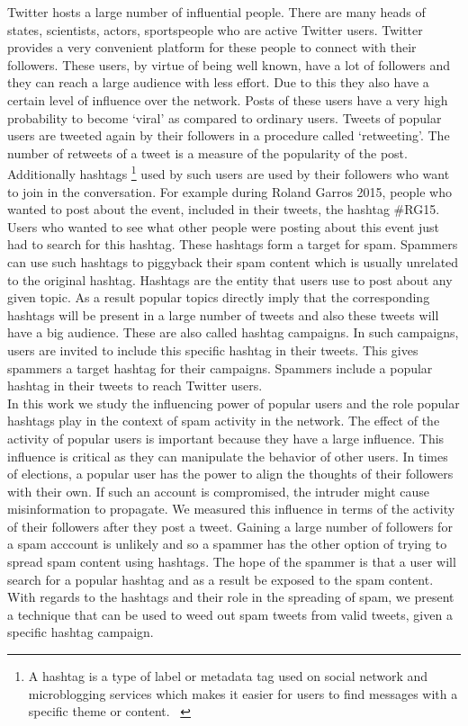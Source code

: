 \documentclass[journal, a4paper, 12pt]{article}
\begin{document}
Twitter hosts a large number of influential people. There are many heads of states, scientists, actors, sportspeople who are active Twitter users. Twitter provides a very convenient platform for these people to connect with their followers. These users, by virtue of being well known, have a lot of followers and they can reach a large audience with less effort. Due to this they also have a certain level of influence over the network. Posts of these users have a very high probability to become ‘viral’ as compared to ordinary users. Tweets of popular users are tweeted again by their followers in a procedure called ‘retweeting’. The number of retweets of a tweet is a measure of the popularity of the post. Additionally hashtags \footnote{A hashtag is a type of label or metadata tag used on social network and microblogging services which makes it easier for users to find messages with a specific theme or content. ~\cite{wikihashtag}} used by such users are used by their followers who want to join in the conversation. For example during Roland Garros 2015, people who wanted to post about the event, included in their tweets, the hashtag \#RG15. Users who wanted to see what other people were posting about this event just had to search for this hashtag. These hashtags form a target for spam. Spammers can use such hashtags to piggyback their spam content which is usually unrelated to the original hashtag. Hashtags are the entity that users use to post about any given topic. As a result popular topics directly imply that the corresponding hashtags will be present in a large number of tweets and also these tweets will have a big audience. These are also called hashtag campaigns. In such campaigns, users are invited to include this specific hashtag in their tweets. This gives spammers a target hashtag for their campaigns. Spammers include a popular hashtag in their tweets to reach Twitter users. \\

In this work we study the influencing power of popular users and the role popular hashtags play in the context of spam activity in the network. The effect of the activity of popular users is important because they have a large influence. This influence is critical as they can manipulate the behavior of other users. In times of elections, a popular user has the power to align the thoughts of their followers with their own. If such an account is compromised, the intruder might cause misinformation to propagate. We measured this influence in terms of the activity of their followers after they post a tweet. Gaining a large number of followers for a spam acccount is unlikely and so a spammer has the other option of trying to spread spam content using hashtags. The hope of the spammer is that a user will search for a popular hashtag and as a result be exposed to the spam content. With regards to the hashtags and their role in the spreading of spam, we present a technique that can be used to weed out spam tweets from valid tweets, given a specific hashtag campaign. \\
\end{document}

